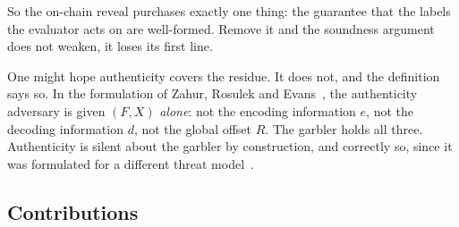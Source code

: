 \documentclass[11pt,a4paper]{article}
\theoremstyle{definition}
\theoremstyle{plain}
\begin{document}
So the on-chain reveal purchases exactly one thing: the guarantee that the
labels the evaluator acts on are well-formed. Remove it and the soundness
argument does not weaken, it loses its first line.

One might hope authenticity covers the residue. It does not, and the definition
says so. In the formulation of Zahur, Rosulek and Evans~\cite{ZRE15}, the
authenticity adversary is given $(F, X)$ \emph{alone}: not the encoding
information $e$, not the decoding information $d$, not the global offset $R$.
The garbler holds all three. Authenticity is silent about the garbler by
construction, and correctly so, since it was formulated for a different threat
model~\cite{BHR12}.

\subsection*{Contributions}
\end{document}
